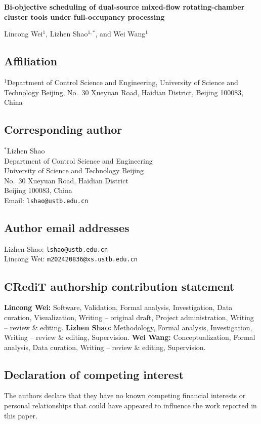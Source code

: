 \documentclass[11pt]{article}
\begin{document}
\begin{center}
{\Large\bfseries Bi-objective scheduling of dual-source mixed-flow rotating-chamber cluster tools under full-occupancy processing\par}
\vspace{1em}
{\large Lincong Wei$^{1}$, Lizhen Shao$^{1,*}$, and Wei Wang$^{1}$\par}
\end{center}

\subsection*{Affiliation}

$^{1}$Department of Control Science and Engineering, University of Science and Technology Beijing, No.\ 30 Xueyuan Road, Haidian District, Beijing 100083, China

\subsection*{Corresponding author}

$^{*}$Lizhen Shao\\
Department of Control Science and Engineering\\
University of Science and Technology Beijing\\
No.\ 30 Xueyuan Road, Haidian District\\
Beijing 100083, China\\
Email: \texttt{lshao@ustb.edu.cn}

\subsection*{Author email addresses}

Lizhen Shao: \texttt{lshao@ustb.edu.cn}\\
Lincong Wei: \texttt{m202420836@xs.ustb.edu.cn}

\subsection*{CRediT authorship contribution statement}
\textbf{Lincong Wei:} Software, Validation, Formal analysis, Investigation, Data curation, Visualization, Writing -- original draft, Project administration, Writing -- review \& editing.
\textbf{Lizhen Shao:} Methodology, Formal analysis, Investigation, Writing -- review \& editing, Supervision.
\textbf{Wei Wang:} Conceptualization, Formal analysis, Data curation, Writing -- review \& editing, Supervision.

\subsection*{Declaration of competing interest}

The authors declare that they have no known competing financial interests or personal relationships that could have appeared to influence the work reported in this paper.
\end{document}

